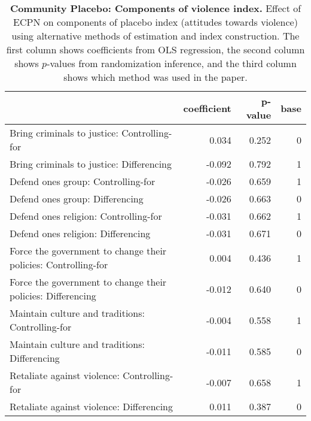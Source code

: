 \documentclass[
]{article}
\begin{document}
\begin{table}[H]
\begin{center}
\label{tab:pl_vio_tab1}
\caption{\textbf{Community Placebo: Components of violence index.} Effect of ECPN on components of placebo index (attitudes towards violence) using alternative methods of estimation and index construction. The first column shows coefficients from OLS regression, the second column shows $p$-values from randomization inference, and the third column shows which method was used in the paper.}
\smallskip

\begin{tabular}{l|r|r|r}
\hline
  & coefficient & p-value & base\\
\hline
Bring criminals to justice: Controlling-for & 0.034 & 0.252 & 0\\
\hline
Bring criminals to justice: Differencing & -0.092 & 0.792 & 1\\
\hline
Defend ones group: Controlling-for & -0.026 & 0.659 & 1\\
\hline
Defend ones group: Differencing & -0.026 & 0.663 & 0\\
\hline
Defend ones religion: Controlling-for & -0.031 & 0.662 & 1\\
\hline
Defend ones religion: Differencing & -0.031 & 0.671 & 0\\
\hline
Force the government to change their policies: Controlling-for & 0.004 & 0.436 & 1\\
\hline
Force the government to change their policies: Differencing & -0.012 & 0.640 & 0\\
\hline
Maintain culture and traditions: Controlling-for & -0.004 & 0.558 & 1\\
\hline
Maintain culture and traditions: Differencing & -0.011 & 0.585 & 0\\
\hline
Retaliate against violence: Controlling-for & -0.007 & 0.658 & 1\\
\hline
Retaliate against violence: Differencing & 0.011 & 0.387 & 0\\
\hline
\end{tabular}


\end{center}
\end{table}
\end{document}
